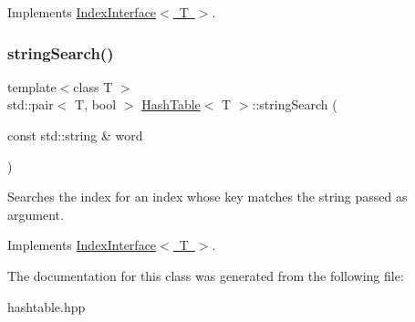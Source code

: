 Implements \mbox{\hyperlink{classIndexInterface}{Index\+Interface$<$ T $>$}}.

\mbox{\label{classHashTable_a801997e4fd99d4054bbdff4002e6e63d}} 
\subsubsection{\texorpdfstring{string\+Search()}{stringSearch()}}
{\footnotesize\ttfamily template$<$class T $>$ \\
std\+::pair$<$ T, bool $>$ \mbox{\hyperlink{classHashTable}{Hash\+Table}}$<$ T $>$\+::string\+Search (\begin{DoxyParamCaption}\item[{const std\+::string \&}]{word }\end{DoxyParamCaption})\hspace{0.3cm}{\ttfamily [virtual]}}

Searches the index for an index whose key matches the string passed as argument. 

Implements \mbox{\hyperlink{classIndexInterface}{Index\+Interface$<$ T $>$}}.



The documentation for this class was generated from the following file\+:\begin{DoxyCompactItemize}
\item 
hashtable.\+hpp\end{DoxyCompactItemize}
